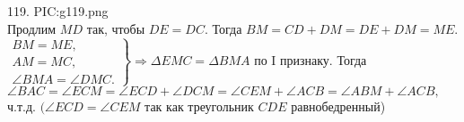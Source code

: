 119. {{PIC:g119.png}}\\
Продлим $MD$ так, чтобы $DE=DC.$ Тогда $BM=CD+DM=DE+DM=ME.$\\ $\left.\begin{array}{l}BM=ME,\\
AM=MC,\\
\angle BMA=\angle DMC. \end{array}\right\}\Rightarrow \Delta EMC=\Delta BMA\text{ по I признаку.}$ Тогда
$\angle BAC=\angle ECM=\angle ECD+\angle DCM=\angle CEM+\angle ACB=\angle ABM+\angle ACB,$ ч.т.д. $(\angle ECD=\angle CEM$ так как треугольник $CDE$ равнобедренный)\\
